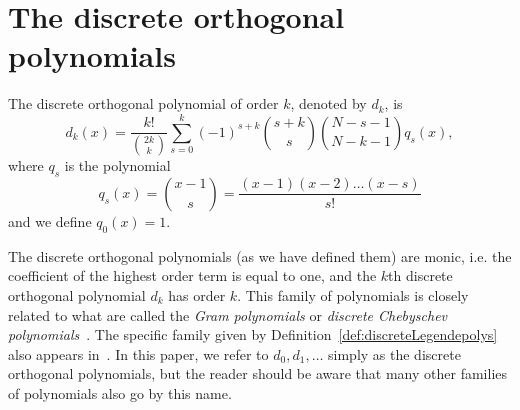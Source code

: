 \documentclass[journal,10pt]{IEEEtran}
\begin{document}

\section{The discrete orthogonal polynomials}\label{sec:discr-orth-polyn}

\begin{definition}  \label{def:discreteLegendepolys}
The discrete orthogonal polynomial of order $k$, denoted by $d_k$, is
\[
d_k(x) = \frac{k!}{\binom{2k}{k}}\sum_{s=0}^k{(-1)^{s+k}\binom{s+k}{s}\binom{N-s-1}{N-k-1}q_s(x)},
\]
where $q_s$ is the polynomial
\[
q_s(x) = \binom{x-1}{s} = \frac{(x-1)(x-2)\dots(x-s)}{s!}
\]
and we define $q_0(x) = 1$.
\end{definition}
The discrete orthogonal polynomials (as we have defined them) are monic, i.e. the coefficient of the highest order term is equal to one, and the $k$th discrete orthogonal polynomial $d_k$ has order $k$.  This family of polynomials is closely related to what are called the \emph{Gram polynomials} or \emph{discrete Chebyschev polynomials}~\cite[p. 323]{Bjork_num_methods_least_square_1996}\cite{Chebyshev_discrete_polys1864,Gram_discrete_polys1883}.  The specific family given by Definition~\ref{def:discreteLegendepolys} also appears in~\cite{Eisinberg2007_discerete_otho_poly_equidist}.  In this paper, we refer to $d_0,d_1,\dots$ simply as the discrete orthogonal polynomials, but the reader should be aware that many other families of polynomials also go by this name.  
\end{document}
